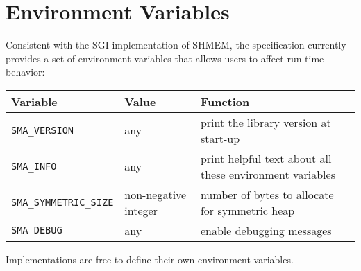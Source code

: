 
\section{Environment Variables }

Consistent with the SGI implementation of SHMEM, the \openshmem specification
currently provides a set of environment variables that allows users
to affect run-time behavior:

\medskip{}


\begin{tabular}{|l|l|l|}
\hline 
Variable & Value & Function\tabularnewline
\hline 
\hline 
\texttt{SMA\_VERSION} & any & print the library version at start-up\tabularnewline
\hline 
\texttt{SMA\_INFO} & any & print helpful text about all these environment variables\tabularnewline
\hline 
\texttt{SMA\_SYMMETRIC\_SIZE} & non-negative integer & number of bytes to allocate for symmetric heap\tabularnewline
\hline 
\texttt{SMA\_DEBUG} & any & enable debugging messages\tabularnewline
\hline 
\end{tabular}

\medskip{}
 

Implementations are free to define their own environment variables.
